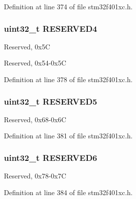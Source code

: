 Definition at line 374 of file stm32f401xc.\+h.

\subsubsection[{\texorpdfstring{R\+E\+S\+E\+R\+V\+E\+D4}{RESERVED4}}]{\setlength{\rightskip}{0pt plus 5cm}uint32\+\_\+t R\+E\+S\+E\+R\+V\+E\+D4}\hypertarget{struct_r_c_c___type_def_ac0018930ee9f18afda25b695b9a4ec16}{}\label{struct_r_c_c___type_def_ac0018930ee9f18afda25b695b9a4ec16}
Reserved, 0x5C

Reserved, 0x54-\/0x5C 

Definition at line 378 of file stm32f401xc.\+h.

\subsubsection[{\texorpdfstring{R\+E\+S\+E\+R\+V\+E\+D5}{RESERVED5}}]{\setlength{\rightskip}{0pt plus 5cm}uint32\+\_\+t R\+E\+S\+E\+R\+V\+E\+D5}\hypertarget{struct_r_c_c___type_def_a99d0f80afb3d4e8ea9c465096498c327}{}\label{struct_r_c_c___type_def_a99d0f80afb3d4e8ea9c465096498c327}
Reserved, 0x68-\/0x6C 

Definition at line 381 of file stm32f401xc.\+h.

\subsubsection[{\texorpdfstring{R\+E\+S\+E\+R\+V\+E\+D6}{RESERVED6}}]{\setlength{\rightskip}{0pt plus 5cm}uint32\+\_\+t R\+E\+S\+E\+R\+V\+E\+D6}\hypertarget{struct_r_c_c___type_def_ac2f0dff647e768676abe64fb2bde63be}{}\label{struct_r_c_c___type_def_ac2f0dff647e768676abe64fb2bde63be}
Reserved, 0x78-\/0x7C 

Definition at line 384 of file stm32f401xc.\+h.


